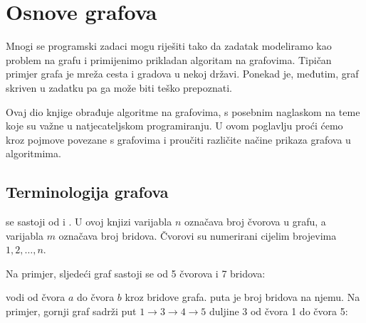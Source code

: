 \chapter{Osnove grafova}

Mnogi se programski zadaci mogu riješiti tako da
zadatak modeliramo kao problem na grafu
i primijenimo prikladan algoritam na grafovima.
Tipičan primjer grafa je mreža
cesta i gradova u nekoj državi.
Ponekad je, međutim, graf skriven
u zadatku pa ga može biti teško prepoznati.

Ovaj dio knjige obrađuje algoritme na grafovima,
s posebnim naglaskom na teme koje
su važne u natjecateljskom programiranju.
U ovom poglavlju proći ćemo kroz pojmove
povezane s grafovima
i proučiti različite načine prikaza grafova u algoritmima.

\section{Terminologija grafova}


 se sastoji od 
i . U ovoj knjizi
varijabla $n$ označava broj čvorova
u grafu, a varijabla $m$ označava
broj bridova.
Čvorovi su numerirani
cijelim brojevima $1,2,\ldots,n$.

Na primjer, sljedeći graf sastoji se od 5 čvorova i 7 bridova:

\begin{center}
\end{center}


 vodi od čvora $a$ do čvora $b$
kroz bridove grafa.
 puta je broj
bridova na njemu.
Na primjer, gornji graf sadrži
put $1 \rightarrow 3 \rightarrow 4 \rightarrow 5$
duljine 3
od čvora 1 do čvora 5:


